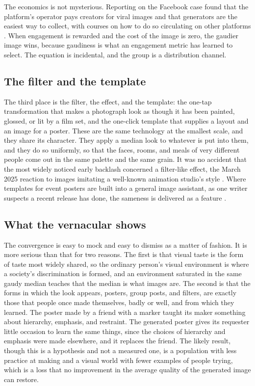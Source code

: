 \documentclass[11pt,a4paper]{article}
\theoremstyle{remark}
\begin{document}
The economics is not mysterious. Reporting on the Facebook case found that the platform's operator pays creators for viral images and that generators are the easiest way to collect, with courses on how to do so circulating on other platforms \cite{TechCo2024}. When engagement is rewarded and the cost of the image is zero, the gaudier image wins, because gaudiness is what an engagement metric has learned to select. The equation is incidental, and the group is a distribution channel.

\subsection{The filter and the template}

The third place is the filter, the effect, and the template: the one-tap transformation that makes a photograph look as though it has been painted, glossed, or lit by a film set, and the one-click template that supplies a layout and an image for a poster. These are the same technology at the smallest scale, and they share its character. They apply a median look to whatever is put into them, and they do so uniformly, so that the faces, rooms, and meals of very different people come out in the same palette and the same grain. It was no accident that the most widely noticed early backlash concerned a filter-like effect, the March 2025 reaction to images imitating a well-known animation studio's style \cite{Meltwater2026}. Where templates for event posters are built into a general image assistant, as one writer suspects a recent release has done, the sameness is delivered as a feature \cite{TechRadarSlop2026}.

\subsection{What the vernacular shows}

The convergence is easy to mock and easy to dismiss as a matter of fashion. It is more serious than that for two reasons. The first is that visual taste is the form of taste most widely shared, so the ordinary person's visual environment is where a society's discrimination is formed, and an environment saturated in the same gaudy median teaches that the median is what images are. The second is that the forms in which the look appears, posters, group posts, and filters, are exactly those that people once made themselves, badly or well, and from which they learned. The poster made by a friend with a marker taught its maker something about hierarchy, emphasis, and restraint. The generated poster gives its requester little occasion to learn the same things, since the choices of hierarchy and emphasis were made elsewhere, and it replaces the friend. The likely result, though this is a hypothesis and not a measured one, is a population with less practice at making and a visual world with fewer examples of people trying, which is a loss that no improvement in the average quality of the generated image can restore.
\end{document}
